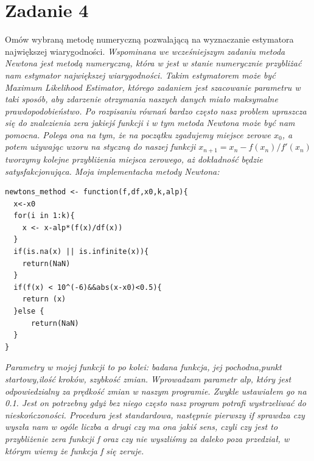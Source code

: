 \documentclass{memoir}
\begin{document}
\section*{Zadanie 4}
Omów wybraną metodę numeryczną pozwalającą na wyznaczanie estymatora największej wiarygodności. \textit{Wspominana we wcześniejszym zadaniu metoda Newtona jest metodą numeryczną, która w jest w stanie numerycznie przybliżać nam estymator największej wiarygodności. Takim estymatorem może być Maximum Likelihood Estimator, którego zadaniem jest szacowanie parametru w taki sposób, aby zdarzenie otrzymania naszych danych miało maksymalne prawdopodobieństwo. Po rozpisaniu równań bardzo często nasz problem upraszcza się do znalezienia zera jakiejś funkcji i w tym metoda Newtona może być nam pomocna. Polega ona na tym, że na początku zgadujemy miejsce zerowe $x_0$, a potem używając wzoru na styczną do naszej funkcji $x_{n+1}=x_n - f(x_n)/f'(x_n)$ tworzymy kolejne przybliżenia miejsca zerowego, aż dokładność będzie satysfakcjonująca. Moja implementacha metody Newtona:}
\begin{verbatim}
newtons_method <- function(f,df,x0,k,alp){
  x<-x0
  for(i in 1:k){
    x <- x-alp*(f(x)/df(x))
  }
  if(is.na(x) || is.infinite(x)){
    return(NaN)
  }
  if(f(x) < 10^(-6)&&abs(x-x0)<0.5){
    return (x)
  }else {
      return(NaN)
  }
}
\end{verbatim}
\textit{Parametry w mojej funkcji to po kolei: badana funkcja, jej pochodna,punkt startowy,ilość kroków, szybkość zmian. Wprowadzam parametr alp, który jest odpowiedzialny za prędkość zmian w naszym programie. Zwykle ustawiałem go na 0.1. Jest on potrzebny gdyż bez niego często nasz program potrafi wystrzeliwać do nieskończoności. Procedura jest standardowa, następnie pierwszy if sprawdza czy wyszła nam w ogóle liczba a drugi czy ma ona jakiś sens, czyli czy jest to przybliżenie zera funkcji f oraz czy nie wyszliśmy za daleko poza przedział, w którym wiemy że funkcja f się zeruje. }
\end{document}
